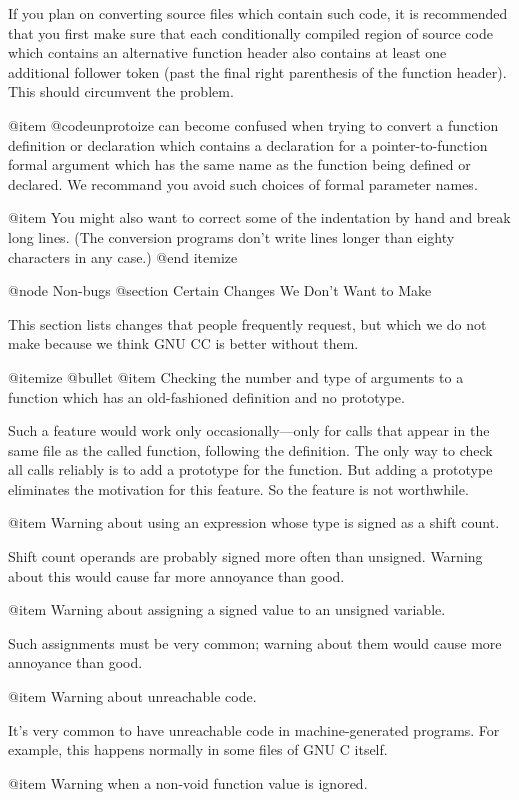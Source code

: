 If you plan on converting source files which contain such code, it is
recommended that you first make sure that each conditionally compiled
region of source code which contains an alternative function header also
contains at least one additional follower token (past the final right
parenthesis of the function header).  This should circumvent the
problem.

@item
@code{unprotoize} can become confused when trying to convert a function
definition or declaration which contains a declaration for a
pointer-to-function formal argument which has the same name as the
function being defined or declared.  We recommand you avoid such choices
of formal parameter names.

@item
You might also want to correct some of the indentation by hand and break
long lines.  (The conversion programs don't write lines longer than
eighty characters in any case.)
@end itemize

@node Non-bugs
@section Certain Changes We Don't Want to Make

This section lists changes that people frequently request, but which
we do not make because we think GNU CC is better without them.

@itemize @bullet
@item 
Checking the number and type of arguments to a function which has an
old-fashioned definition and no prototype.

Such a feature would work only occasionally---only for calls that appear
in the same file as the called function, following the definition.  The
only way to check all calls reliably is to add a prototype for the
function.  But adding a prototype eliminates the motivation for this
feature.  So the feature is not worthwhile.

@item 
Warning about using an expression whose type is signed as a shift count.

Shift count operands are probably signed more often than unsigned.
Warning about this would cause far more annoyance than good.

@item
Warning about assigning a signed value to an unsigned variable.

Such assignments must be very common; warning about them would cause
more annoyance than good.

@item 
Warning about unreachable code.

It's very common to have unreachable code in machine-generated
programs.  For example, this happens normally in some files of GNU C
itself.

@item
Warning when a non-void function value is ignored.

